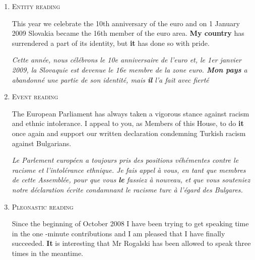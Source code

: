 \documentclass[10pt, a4paper]{article} \usepackage{lrec} \usepackage{multibib}
\begin{document}
%
%
\begin{enumerate}

\item\label{ex:nominal} \textsc{Entity reading}

This year we celebrate the 10th anniversary of the euro and on 1 January 2009
Slovakia became the 16th member of the euro area. \textbf{My country} has surrendered a
part of its identity, but \textbf{it} has done so with pride.

\textit{Cette année, nous célébrons le 10e anniversaire de l'euro et, le 1er janvier
2009, la Slovaquie est devenue le 16e membre de la zone euro. \textbf{Mon pays} a
abandonné une partie de son identité, mais \textbf{il} l'a fait avec fierté}



\item\label{ex:event}\textsc{Event reading}

The European Parliament has always taken a vigorous stance against racism and
ethnic intolerance. I appeal to you, as Members of this House, to do
\textbf{it} once again and support our written declaration condemning Turkish racism against Bulgarians.

\textit{Le Parlement européen a toujours pris des positions véhémentes contre le racisme
et l'intolérance ethnique. Je fais appel à vous, en tant que membres de cette
Assemblée, pour que vous \textbf{le} fassiez à nouveau, et que vous souteniez notre
déclaration écrite condamnant le racisme turc à l'égard des Bulgares.} 



\item\label{ex:pleo} \textsc{Pleonastic reading}

Since the beginning of October 2008 I have been trying to get speaking time in
the one -minute contributions and I am pleased that I have finally succeeded.
\textbf{It} is interesting that Mr Rogalski has been allowed to speak three times in the meantime. 



\end{enumerate}
\end{document}
